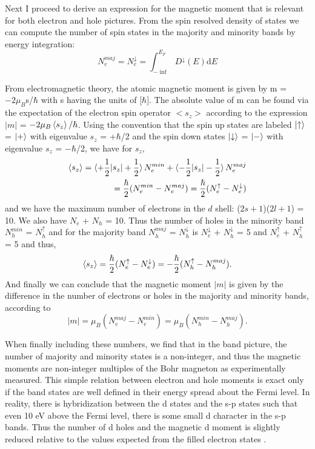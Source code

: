 Next I proceed to derive an expression for the magnetic moment that is relevant for both electron and hole pictures. From the spin resolved density of states we can compute the number of spin states in the majority and minority bands by energy integration:
\begin{equation}
N_{e}^{maj}=N_e^\downarrow = \int_{-\inf}^{E_F}D^\downarrow(E)\text{d}E
\end{equation}

From electromagnetic theory, the atomic magnetic moment is given by m = $-2\mu_B$s/$\hbar$ with s having the units of [$\hbar$]. The absolute value of m can be found via the expectation of the electron spin operator $<s_z>$ according to the expression $|m|$ = $-2\mu_B\braket{s_z}/\hbar$. Using the convention that the spin up states are labeled $\ket{\uparrow}$ = $\ket{+}$ with eigenvalue $s_z$ = +$\hbar$/2 and the spin down states $\ket{\downarrow}$ = $\ket{-}$ with eigenvalue $s_z$ = $-\hbar$/2, we have for $s_z$,
\begin{eqnarray}
\braket{s_z} = \braket{+\frac{1}{2}|s_z|+\frac{1}{2}}N_e^{min} + \braket{-\frac{1}{2}|s_z|-\frac{1}{2}}N_e^{maj} \\
= \frac{\hbar}{2}(N_e^{min}-N_e^{maj}) = \frac{\hbar}{2}(N_e^{\uparrow} - N_e^{\downarrow})
\end{eqnarray}
and we have the maximum number of electrons in the $d$ shell: ($2s+1$)($2l+1$) = 10. We also have $N_e$ + $N_h$ = 10. Thus  the number of holes in the minority band $N_h^{min}$ = $N_h^{\uparrow}$ and for the majority band $N_h^{maj}$ = $N_h^\downarrow$ is $N_e^\downarrow$ + $N_h^\downarrow$ = 5 and $N_e^\uparrow$ + $N_h^\uparrow$ = 5 and thus,
\begin{equation}
\braket{s_z} = \frac{\hbar}{2}(N_e^\uparrow-N_e^\downarrow) = -\frac{\hbar}{2}(N_h^\uparrow - N_h^{maj}).
\end{equation}
And finally we can conclude that the magnetic moment $|m|$ is given by the difference in the number of electrons or holes in the majority and minority bands, according to
\begin{equation}
|m| = \mu_B(N_e^{maj}-N_e^{min}) = \mu_B(N_h^{min} - N_h^{maj}).
\end{equation}

When finally including these numbers, we find that in the band picture, the number of majority and minority states is a non-integer, and thus the magnetic moments are non-integer multiples of the Bohr magneton as experimentally measured. This simple relation between electron and hole moments is exact only if the band states are well defined in their energy spread about the Fermi level. In reality, there is hybridization between the d states and the s-p states such that even  10 eV above the Fermi level, there is some small d character in the s-p bands. Thus the number of d holes and the magnetic d moment is slightly reduced relative to the values expected from the filled electron states \cite{Wu1994}.

